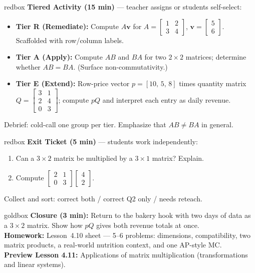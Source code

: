 \documentclass[10pt]{article}
\begin{document}
\begin{skillbox}{redbox}
    \textbf{Tiered Activity (15 min)} --- teacher assigns or students self-select:
    \begin{itemize}
        \item \textbf{Tier R (Remediate):} Compute $A\mathbf{v}$ for $A=\begin{bmatrix}1&2\\3&4\end{bmatrix}$, $\mathbf{v}=\begin{bmatrix}5\\6\end{bmatrix}$. Scaffolded with row/column labels.
        \item \textbf{Tier A (Apply):} Compute $AB$ and $BA$ for two $2\times 2$ matrices; determine whether $AB=BA$. (Surface non-commutativity.)
        \item \textbf{Tier E (Extend):} Row-price vector $p=[10,\,5,\,8]$ times quantity matrix $Q=\begin{bmatrix}3&1\\2&4\\0&3\end{bmatrix}$; compute $pQ$ and interpret each entry as daily revenue.
    \end{itemize}
    Debrief: cold-call one group per tier. Emphasize that $AB\neq BA$ in general.
\end{skillbox}

\begin{skillbox}{redbox}
    \textbf{Exit Ticket (5 min)} --- students work independently:
    \begin{enumerate}
        \item Can a $3\times 2$ matrix be multiplied by a $3\times 1$ matrix? Explain.
        \item Compute $\begin{bmatrix}2&1\\0&3\end{bmatrix}\begin{bmatrix}4\\2\end{bmatrix}$.
    \end{enumerate}
    Collect and sort: correct both / correct Q2 only / needs reteach.
\end{skillbox}

\begin{skillbox}{goldbox}
    \textbf{Closure (3 min):} Return to the bakery hook with two days of data as a $3\times 2$ matrix. Show how $pQ$ gives both revenue totals at once.\\[4pt]
    \textbf{Homework:} Lesson~4.10 sheet --- 5--6 problems: dimensions, compatibility, two matrix products, a real-world nutrition context, and one AP-style MC.\\[4pt]
    \textbf{Preview Lesson 4.11:} Applications of matrix multiplication (transformations and linear systems).
\end{skillbox}
\end{document}
